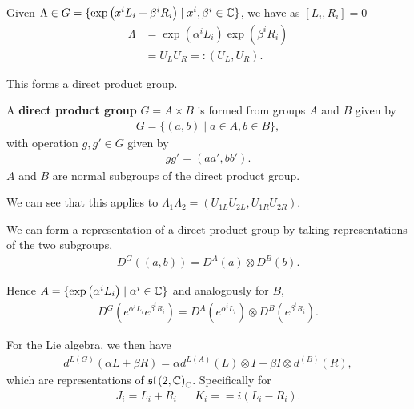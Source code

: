 Given $\Lambda \in G = \{\exp \left( x^{i} L_i + \beta^{i} R_i \right)  \mid  x^{i}, \beta^{i} \in \mathbb{C}\} $, we have as $\left[ L_i, R_i \right] = 0$
\begin{align}
    \Lambda &= \exp \left( \alpha^{i}L_i \right) \exp \left( \beta^{i}R_i \right) \\
    &= U_L U_R =: \left( U_L, U_R \right)
.\end{align}

This forms a direct product group.

\begin{note}
    A \textbf{direct product group} $G = A \times B$ is formed from groups $A$ and $B$ given by
    \begin{align}
        G = \{\left( a,b \right)  \mid a \in A, b \in B \} 
    ,\end{align}
    with operation $g, g' \in G$ given by
    \begin{align}
        g g' = \left( a a', b b' \right) 
    .\end{align}
    $A$ and $B$ are normal subgroups of the direct product group.
\end{note}

We can see that this applies to $\Lambda_1 \Lambda_2 = \left( U_{1L} U_{2L}, U_{1R} U_{2R} \right)$. 

We can form a representation of a direct product group by taking representations of the two subgroups,
\begin{align}
    D^{G}\left( \left( a,b \right)  \right) = D^{A}\left( a \right) \otimes D^{B}\left( b \right) 
.\end{align}

Hence $A = \{\exp \left( \alpha^{i}L_i \right)  \mid \alpha^{i} \in \mathbb{C}\} $ and analogously for $B$,
\begin{align}
    D^{G}\left( e^{\alpha^{i}L_i} e^{\beta^{i} R_i} \right) = D^{A}\left( e^{\alpha^{i}L_i} \right) \otimes D^{B} \left( e^{\beta^{i} R_i} \right) 
.\end{align}

For the Lie algebra, we then have
\begin{align}
    d^{L\left( G \right) }\left( \alpha L + \beta R \right) = \alpha d^{L\left( A \right) } \left( L \right) \otimes I + \beta I \otimes d^{\left( B \right) }\left( R \right) 
,\end{align}
which are representations of $\mathfrak{sl}\left( 2,\mathbb{C} \right)_{\mathbb{C}}$. Specifically for
\begin{align}
    J_i = L_i + R_i && K_i = =i \left( L_i - R_i \right) 
.\end{align}

